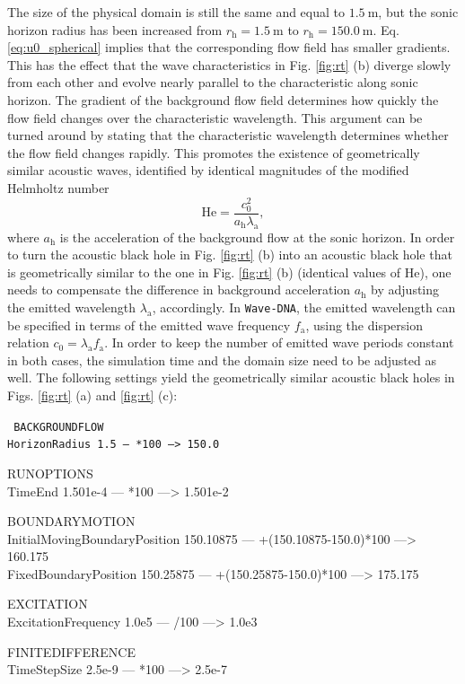 The size of the physical domain is still the same and equal to $1.5\:\mathrm{m}$, but the sonic horizon radius has been increased from $r_{\mathrm{h}}=1.5\:\mathrm{m}$ to $r_{\mathrm{h}}=150.0\:\mathrm{m}$. Eq. \eqref{eq:u0_spherical} implies that the corresponding flow field has smaller gradients. This has the effect that the wave characteristics in Fig. \ref{fig:rt} (b) diverge slowly from each other and evolve nearly parallel to the characteristic along sonic horizon. The gradient of the background flow field determines how quickly the flow field changes over the characteristic wavelength. This argument can be turned around by stating that the characteristic wavelength determines whether the flow field changes rapidly. This promotes the existence of geometrically similar acoustic waves, identified by identical magnitudes of the modified Helmholtz number
\begin{equation}
    \mathrm{He} = \dfrac{c_0^2}{a_{\mathrm{h}}\lambda_{\mathrm{a}}},
    \label{eq:Helmholtz}
\end{equation}
where $a_{\mathrm{h}}$ is the acceleration of the background flow at the sonic horizon. In order to turn the acoustic black hole in Fig. \ref{fig:rt} (b) into an acoustic black hole that is geometrically similar to the one in Fig. \ref{fig:rt} (b) (identical values of $\mathrm{He}$), one needs to compensate the difference in background acceleration $a_{\mathrm{h}}$ by adjusting the emitted wavelength $\lambda_{\mathrm{a}}$, accordingly. In {\tt Wave-DNA}, the emitted wavelength can be specified in terms of the emitted wave frequency $f_{\mathrm{a}}$, using the dispersion relation $c_0=\lambda_{\mathrm{a}}f_{\mathrm{a}}$. In order to keep the number of emitted wave periods constant in both cases, the simulation time and the domain size need to be adjusted as well. The following settings yield the geometrically similar acoustic black holes in Figs. \ref{fig:rt} (a) and \ref{fig:rt} (c):

{\tt
BACKGROUNDFLOW \\
HorizonRadius 1.5 --- *100 ---> 150.0

RUNOPTIONS \\
TimeEnd 1.501e-4 --- *100 ---> 1.501e-2

BOUNDARYMOTION \\
InitialMovingBoundaryPosition 150.10875 --- +(150.10875-150.0)*100 ---> 160.175 \\
FixedBoundaryPosition 150.25875 --- +(150.25875-150.0)*100 ---> 175.175

EXCITATION \\
ExcitationFrequency 1.0e5 --- /100 ---> 1.0e3

FINITEDIFFERENCE \\
TimeStepSize 2.5e-9 --- *100 ---> 2.5e-7
}

